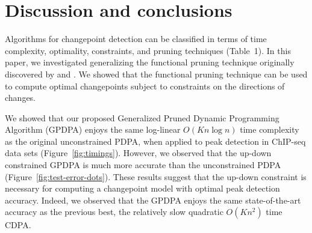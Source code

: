 \documentclass[twoside,11pt]{article}
\begin{document}
%   

\section{Discussion and conclusions}
\label{sec:discussion}

Algorithms for changepoint detection can be classified in terms of
time complexity, optimality, constraints, and pruning techniques
(Table~1). In this paper, we investigated generalizing the functional
pruning technique originally discovered by \citet{pruned-dp} and
\citet{phd-johnson}. We showed that the functional pruning technique can
be used to compute optimal changepoints subject to constraints
on the directions of changes.

We showed that our proposed Generalized Pruned Dynamic Programming
Algorithm (GPDPA) enjoys the same log-linear $O(Kn\log n)$ time
complexity as the original unconstrained PDPA, when applied to peak
detection in ChIP-seq data sets (Figure~\ref{fig:timings}). However,
we observed that the up-down constrained GPDPA is much more accurate
than the unconstrained PDPA (Figure~\ref{fig:test-error-dots}). These
results suggest that the up-down constraint is necessary for computing
a changepoint model with optimal peak detection accuracy. Indeed, we
observed that the GPDPA enjoys the same state-of-the-art accuracy as
the previous best, the relatively slow quadratic $O(Kn^2)$ time
CDPA.
\end{document}

